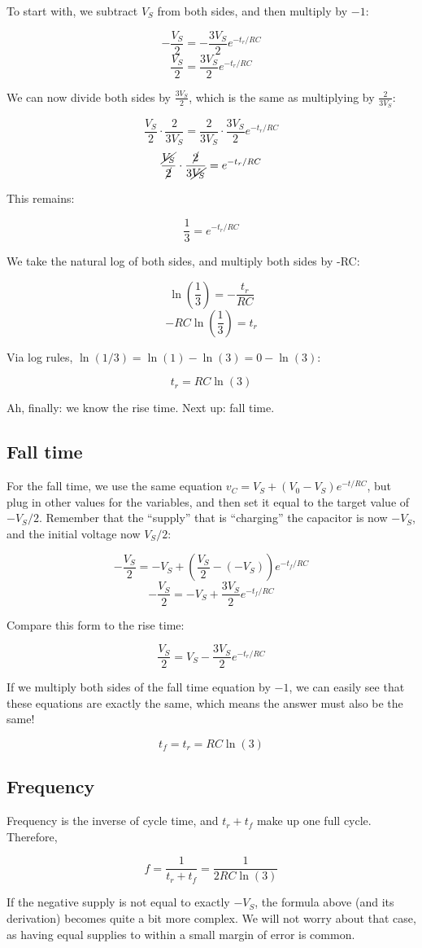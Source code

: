 To start with, we subtract $V_S$ from both sides, and then multiply by $-1$:

\[ -\frac{V_S}{2} = - \frac{3V_S}{2} e^{-t_r/RC} \]
\[ \frac{V_S}{2} = \frac{3V_S}{2} e^{-t_r/RC} \]

We can now divide both sides by $\displaystyle \frac{3 V_S}{2}$, which is the same as multiplying by $\displaystyle \frac{2}{3 V_S}$:

\[ \frac{V_S}{2} \cdot \frac{2}{3 V_S} = \frac{2}{3 V_S} \cdot \frac{3V_S}{2} e^{-t_r/RC} \]
\[ \frac{\cancel{V_S}}{\cancel{2}} \cdot \frac{\cancel{2}}{3 \cancel{V_S}} = e^{-t_r/RC} \]

This remains:

\[ \frac{1}{3} = e^{-t_r/RC} \]

We take the natural log of both sides, and multiply both sides by -RC:

\[ \ln{\left(\frac{1}{3}\right)} = -\frac{t_r}{RC} \]
\[ -RC \ln{\left(\frac{1}{3}\right)} = t_r \]

Via log rules, $\ln{(1/3)} = \ln{(1)} - \ln{(3)} = 0 - \ln{(3)}$:

\[ t_r = RC \ln{(3)} \]

Ah, finally: we know the rise time. Next up: fall time.

\subsection{Fall time}
For the fall time, we use the same equation $v_C = V_S + (V_0 - V_S)e^{-t/RC}$, but plug in other values for the variables, and then set it equal to the target value of $-V_S/2$. Remember that the ``supply'' that is ``charging'' the capacitor is now $-V_S$, and the initial voltage now $V_S/2$:

\[ -\frac{V_S}{2} = -V_S + (\frac{V_S}{2} - (-V_S))e^{-t_f/RC} \]
\[ -\frac{V_S}{2} = -V_S + \frac{3 V_S}{2} e^{-t_f/RC} \]

Compare this form to the rise time:

\[ \frac{V_S}{2} = V_S - \frac{3V_S}{2} e^{-t_r/RC} \]

If we multiply both sides of the fall time equation by $-1$, we can easily see that these equations are exactly the same, which means the answer must also be the same!

\[ t_f = t_r = RC \ln{(3)} \]

\subsection{Frequency}
Frequency is the inverse of cycle time, and $t_r + t_f$ make up one full cycle. Therefore,

\[ f = \frac{1}{t_r + t_f} = \frac{1}{2 RC \ln{(3)}} \]

If the negative supply is not equal to exactly $-V_S$, the formula above (and its derivation) becomes quite a bit more complex. We will not worry about that case, as having equal supplies to within a small margin of error is common.
